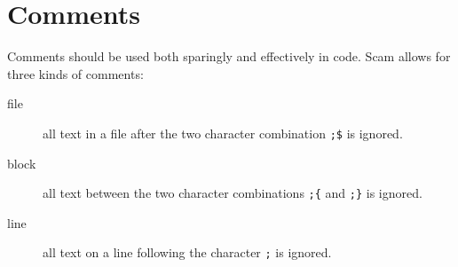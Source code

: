 \chapter{Comments}
\label{Comments}

Comments should be used both sparingly and effectively in code.
Scam allows for three kinds of comments:

\begin{description}
\item[file]
    all text in a file after the
    two character combination \verb!;$! is ignored.
\item[block]
    all text between the
    two character combinations \verb!;{! and \verb!;}! is ignored.
\item[line]
    all text on a line following the character \verb!;! is ignored.
\end{description}
